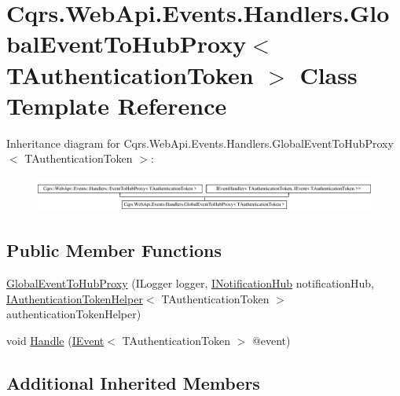 \hypertarget{classCqrs_1_1WebApi_1_1Events_1_1Handlers_1_1GlobalEventToHubProxy}{}\section{Cqrs.\+Web\+Api.\+Events.\+Handlers.\+Global\+Event\+To\+Hub\+Proxy$<$ T\+Authentication\+Token $>$ Class Template Reference}
\label{classCqrs_1_1WebApi_1_1Events_1_1Handlers_1_1GlobalEventToHubProxy}
Inheritance diagram for Cqrs.\+Web\+Api.\+Events.\+Handlers.\+Global\+Event\+To\+Hub\+Proxy$<$ T\+Authentication\+Token $>$\+:\begin{figure}[H]
\begin{center}
\leavevmode
\includegraphics[height=1.171548cm]{classCqrs_1_1WebApi_1_1Events_1_1Handlers_1_1GlobalEventToHubProxy}
\end{center}
\end{figure}
\subsection*{Public Member Functions}
\begin{DoxyCompactItemize}
\item 
\hyperlink{classCqrs_1_1WebApi_1_1Events_1_1Handlers_1_1GlobalEventToHubProxy_a42cb05f70d5705bd182f42caf297a960_a42cb05f70d5705bd182f42caf297a960}{Global\+Event\+To\+Hub\+Proxy} (I\+Logger logger, \hyperlink{interfaceCqrs_1_1WebApi_1_1SignalR_1_1Hubs_1_1INotificationHub}{I\+Notification\+Hub} notification\+Hub, \hyperlink{interfaceCqrs_1_1Authentication_1_1IAuthenticationTokenHelper}{I\+Authentication\+Token\+Helper}$<$ T\+Authentication\+Token $>$ authentication\+Token\+Helper)
\item 
void \hyperlink{classCqrs_1_1WebApi_1_1Events_1_1Handlers_1_1GlobalEventToHubProxy_a80deae2ad156cccae069e9cf7b0cd6aa_a80deae2ad156cccae069e9cf7b0cd6aa}{Handle} (\hyperlink{interfaceCqrs_1_1Events_1_1IEvent}{I\+Event}$<$ T\+Authentication\+Token $>$ @event)
\end{DoxyCompactItemize}
\subsection*{Additional Inherited Members}


